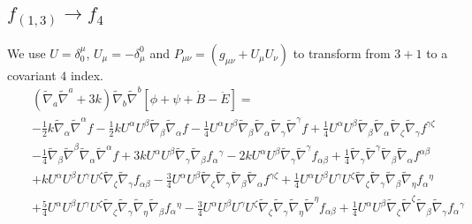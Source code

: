 \documentclass[10pt,letterpaper]{article}
\numberwithin{equation}{section}
\begin{document}
\subsection{$f_{(1,3)}\to f_{4}$}
We use $U=\delta^\mu_0$, $U_\mu = -\delta_\mu^0$ and $P_{\mu\nu} = (g_{\mu\nu} + U_\mu U_\nu)$ to transform from $3+1$ to a covariant $4$ index. 
\begin{eqnarray}
&&(\tilde\nabla_a\tilde\nabla^a + 3k)\tilde\nabla_b\tilde\nabla^b[ \phi +\psi + \dot B - \ddot E] =
\nonumber\\
&& - \tfrac{1}{2} k \tilde{\nabla}_{\alpha }\tilde{\nabla}^{\alpha }f -  \tfrac{1}{2} k U^{\alpha } U^{\beta } \tilde{\nabla}_{\beta }\tilde{\nabla}_{\alpha }f -  \tfrac{1}{4} U^{\alpha } U^{\beta } \tilde{\nabla}_{\beta }\tilde{\nabla}_{\alpha }\tilde{\nabla}_{\gamma }\tilde{\nabla}^{\gamma }f + \tfrac{1}{4} U^{\alpha } U^{\beta } \tilde{\nabla}_{\beta }\tilde{\nabla}_{\alpha }\tilde{\nabla}_{\zeta }\tilde{\nabla}_{\gamma }f^{\gamma \zeta } \nonumber \\ 
&& -  \tfrac{1}{4} \tilde{\nabla}_{\beta }\tilde{\nabla}^{\beta }\tilde{\nabla}_{\alpha }\tilde{\nabla}^{\alpha }f + 3 k U^{\alpha } U^{\beta } \tilde{\nabla}_{\gamma }\tilde{\nabla}_{\beta }f_{\alpha }{}^{\gamma } - 2 k U^{\alpha } U^{\beta } \tilde{\nabla}_{\gamma }\tilde{\nabla}^{\gamma }f_{\alpha \beta } + \tfrac{1}{4} \tilde{\nabla}_{\gamma }\tilde{\nabla}^{\gamma }\tilde{\nabla}_{\beta }\tilde{\nabla}_{\alpha }f^{\alpha \beta } \nonumber \\ 
&& + k U^{\alpha } U^{\beta } U^{\gamma } U^{\zeta } \tilde{\nabla}_{\zeta }\tilde{\nabla}_{\gamma }f_{\alpha \beta } -  \tfrac{3}{4} U^{\alpha } U^{\beta } \tilde{\nabla}_{\zeta }\tilde{\nabla}_{\gamma }\tilde{\nabla}_{\beta }\tilde{\nabla}_{\alpha }f^{\gamma \zeta } + \tfrac{1}{4} U^{\alpha } U^{\beta } U^{\gamma } U^{\zeta } \tilde{\nabla}_{\zeta }\tilde{\nabla}_{\gamma }\tilde{\nabla}_{\beta }\tilde{\nabla}_{\eta }f_{\alpha }{}^{\eta } \nonumber \\ 
&& + \tfrac{5}{4} U^{\alpha } U^{\beta } U^{\gamma } U^{\zeta } \tilde{\nabla}_{\zeta }\tilde{\nabla}_{\gamma }\tilde{\nabla}_{\eta }\tilde{\nabla}_{\beta }f_{\alpha }{}^{\eta } -  \tfrac{3}{4} U^{\alpha } U^{\beta } U^{\gamma } U^{\zeta } \tilde{\nabla}_{\zeta }\tilde{\nabla}_{\gamma }\tilde{\nabla}_{\eta }\tilde{\nabla}^{\eta }f_{\alpha \beta } + \tfrac{1}{4} U^{\alpha } U^{\beta } \tilde{\nabla}_{\zeta }\tilde{\nabla}^{\zeta }\tilde{\nabla}_{\beta }\tilde{\nabla}_{\gamma }f_{\alpha }{}^{\gamma } \nonumber \\ 

\end{eqnarray}
\end{document}
